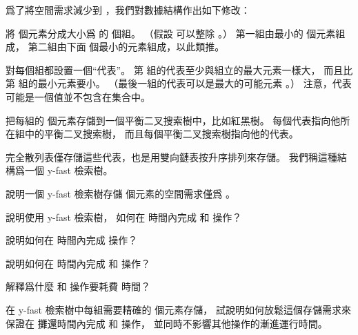 \startANSWER
{}
\stopANSWER

爲了將空間需求減少到 ，我們對數據結構作出如下修改：
\startigNum[2]
\item 將  個元素分成大小爲  的  個組。
（假設  可以整除 。）
第一組由最小的  個元素組成，
第二組由下面  個最小的元素組成，以此類推。

\item 對每個組都設置一個“代表”。
第  組的代表至少與組立的最大元素一樣大，
而且比第  組的最小元素要小。
（最後一組的代表可以是最大的可能元素 。）
注意，代表可能是一個值並不包含在集合中。

\item 把每組的  個元素存儲到一個平衡二叉搜索樹中，比如紅黑樹。
每個代表指向他所在組中的平衡二叉搜索樹，
而且每個平衡二叉搜索樹指向他的代表。

\item 完全散列表僅存儲這些代表，也是用雙向鏈表按升序排列來存儲。
\stopigNum
我們稱這種結構爲一個 y-fast 檢索樹。

\startigBase[continue]\startitem
說明一個 y-fast 檢索樹存儲  個元素的空間需求僅爲 。
\stopitem\stopigBase

\startANSWER
{}
\stopANSWER

\startigBase[continue]\startitem
說明使用 y-fast 檢索樹，
如何在  時間內完成  和  操作？
\stopitem\stopigBase

\startANSWER
{}
\stopANSWER

\startigBase[continue]\startitem
說明如何在  時間內完成  操作？
\stopitem\stopigBase

\startANSWER
{}
\stopANSWER

\startigBase[continue]\startitem
說明如何在  時間內完成  和  操作？
\stopitem\stopigBase

\startANSWER
{}
\stopANSWER

\startigBase[continue]\startitem
解釋爲什麼  和  操作要耗費  時間？
\stopitem\stopigBase

\startANSWER
{}
\stopANSWER

\startigBase[continue]\startitem
在 y-fast 檢索樹中每組需要精確的  個元素存儲，
試說明如何放鬆這個存儲需求來保證在  攤還時間內完成  和  操作，
並同時不影響其他操作的漸進運行時間。
\stopitem\stopigBase

\startANSWER
{}
\stopANSWER

\stopPROBLEM

\stopsubject%
